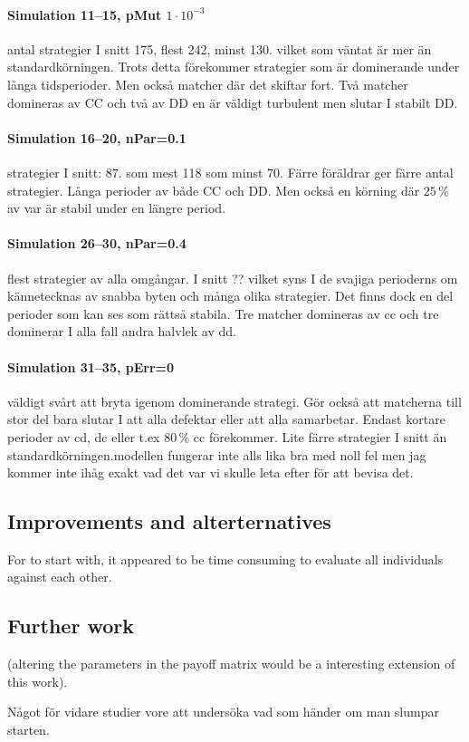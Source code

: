 
\paragraph{Simulation 11--15, pMut $1\cdot 10^{-3}$}
antal strategier I snitt 175, flest 242, minst 130. vilket som väntat är mer än standardkörningen. Trots
detta förekommer strategier som är dominerande under långa tidsperioder. Men också matcher där det
skiftar fort. Två matcher domineras av CC och två av DD en är väldigt turbulent men slutar I stabilt
DD.

\paragraph{Simulation 16--20, nPar=0.1}
strategier I snitt: 87. som mest 118 som minst 70. Färre föräldrar ger färre antal strategier. Långa
perioder av både CC och DD. Men också en körning där $25\,\%$ av var är stabil under en längre period.

\paragraph{Simulation 26--30, nPar=0.4}
flest strategier av alla omgångar. I snitt ?? vilket syns I de svajiga perioderns om kännetecknas av
snabba byten och många olika strategier. Det finns dock en del perioder som kan ses som rättså
stabila. Tre matcher domineras av cc och tre dominerar I alla fall andra halvlek av dd.

\paragraph{Simulation 31--35, pErr=0}
väldigt svårt att bryta igenom dominerande strategi. Gör också att matcherna till stor del bara slutar I
att alla defektar eller att alla samarbetar. Endast kortare perioder av cd, dc eller t.ex $80\,\%$ cc
förekommer. Lite färre strategier I snitt än standardkörningen.modellen fungerar inte alls lika bra med
noll fel men jag kommer inte ihåg exakt vad det var vi skulle leta efter för att bevisa det.


\subsection{Improvements and alterternatives}
For to start with, it appeared to be time consuming to evaluate all individuals against each other.


\subsection{Further work}
(altering the parameters in the payoff matrix would be a interesting extension of this work).

Något för vidare studier vore att undersöka vad som händer om man slumpar starten.




